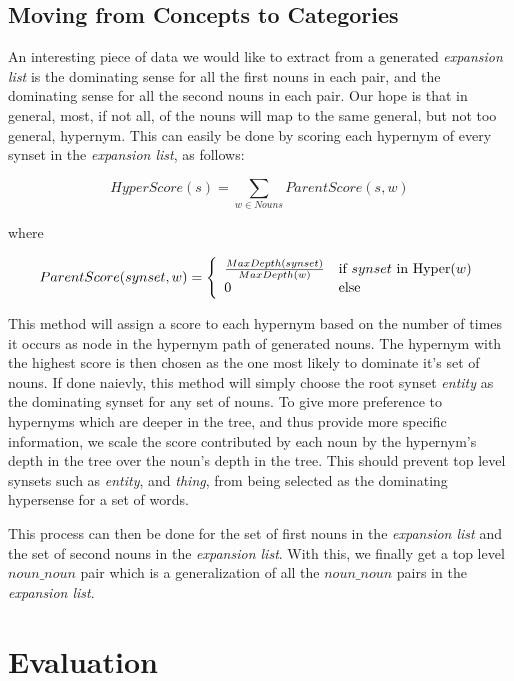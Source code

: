 \documentclass[11pt]{article}
\begin{document}
\subsection{Moving from Concepts to Categories}

An interesting piece of data we would like to extract from a generated
\emph{expansion list} is the dominating sense for all the first nouns in each
pair, and the dominating sense for all the second nouns in each pair.  Our hope
is that in general, most, if not all, of the nouns will map to the same general, but
not too general, hypernym.  This can easily be done by scoring each hypernym of
every synset in the \emph{expansion list}, as follows:

\small
\[ HyperScore(s) = \displaystyle\sum_{w \in Nouns} ParentScore(s, w) 
\]

\normalsize
where

\small
\[ ParentScore(synset, w) = \left\{ 
 \begin{array}{l l}
   {\frac {MaxDepth(synset)} {MaxDepth(w)}} & \mbox{if $synset$ in Hyper($w$)}\\
   0 & \mbox{else}\\
 \end{array} \right.
\]

\normalsize
This method will assign a score to each hypernym based on the number of times it
occurs as node in the hypernym path of generated nouns.  The hypernym with the
highest score is then chosen as the one most likely to dominate it's set of nouns.
If done naievly, this method will simply choose the root synset \emph{entity} as
the dominating synset for any set of nouns.  To give more preference
to hypernyms which are deeper in the tree, and thus provide more specific
information, we scale the score contributed by each noun by the hypernym's
depth in the tree over the noun's depth in the tree.  This should prevent top
level synsets such as \emph{entity}, and \emph{thing}, from being selected as 
the dominating hypersense for a set of words.  

This process can then be done for the set of first nouns in the \emph{expansion
list} and the set of second nouns in the \emph{expansion list}.  With this, we
finally get a top level $noun\_noun$ pair which is a generalization of all the
$noun\_noun$ pairs in the \emph{expansion list}.

\section{Evaluation}
\label{sec:evaluation}
\end{document}
